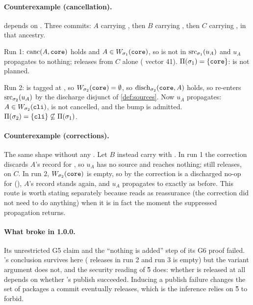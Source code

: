 \paragraph{Counterexample (cancellation).}  depends on .
Three commits: $A$ carrying , then $B$
carrying , then $C$ carrying , in
that ancestry.

Run 1: $\mathrm{canc}(A,\texttt{core})$ holds and $A \in W_{\sigma_1}(\texttt{core})$, so
 is not in $\mathrm{src}_{\sigma_1}(u_A)$ and $u_A$ propagates to nothing;
 releases  from $C$ alone (\SPEC{} vector 41).
$\Pi(\sigma_1) = \{\texttt{core}\}$:  is not planned.

Run 2:  is tagged at \Head{}, so $W_{\sigma_2}(\texttt{core}) =
\emptyset$, so $\mathrm{disch}_{\sigma_2}(\texttt{core},A)$ holds, so  re-enters
$\mathrm{src}_{\sigma_2}(u_A)$ by the discharge disjunct of \cref{def:sources}. Now $u_A$
propagates: $A \in W_{\sigma_2}(\texttt{cli})$,  is not cancelled, and
the bump is admitted. $\Pi(\sigma_2) = \{\texttt{cli}\} \not\subseteq
\Pi(\sigma_1)$.

\paragraph{Counterexample (corrections).} The same shape without any
. Let $B$ instead carry  with
. In run 1 the correction discards $A$'s record for
, so $u_A$ has no source and reaches nothing;  still
releases, on $C$. In run 2, $W_{\sigma_2}(\texttt{core})$ is empty, so by
 the correction is a discharged no-op for 
(), $A$'s record stands again, and $u_A$ propagates to 
exactly as before. This route is worth stating separately because 
reads as reassurance (the correction did not need to do anything) when it
is in fact the moment the suppressed propagation returns.

\paragraph{What broke in 1.0.0.} Its unrestricted G5 claim and the ``nothing is added'' step of its G6 proof failed. 's conclusion survives here (
releases in run 2 and run 3 is empty) but the variant argument does not, and
the security reading of \G{5} does: whether  is released at all
depends on whether 's publish succeeded. Inducing a publish failure
changes the set of packages a commit eventually releases, which is the
inference  relies on \G{5} to forbid.

